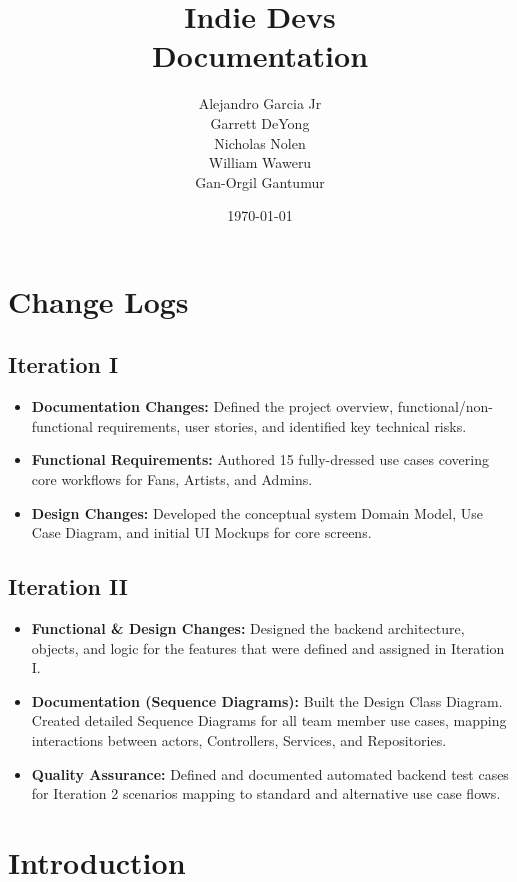 \documentclass[11pt]{report}
\title{\textbf{Indie Devs\\Documentation}}
\author{
{Alejandro Garcia Jr}\\ {Garrett DeYong} \\ {Nicholas Nolen}\\ {William Waweru}\\ {Gan-Orgil Gantumur}}
\date{\today}
\begin{document}
\maketitle

\chapter*{Change Logs}


\section*{Iteration I}
\begin{itemize}
  \item \textbf{Documentation Changes:} Defined the project overview, functional/non-functional requirements, user stories, and identified key technical risks.
  \item \textbf{Functional Requirements:} Authored 15 fully-dressed use cases covering core workflows for Fans, Artists, and Admins.
  \item \textbf{Design Changes:} Developed the conceptual system Domain Model, Use Case Diagram, and initial UI Mockups for core screens.
\end{itemize}

\section*{Iteration II}
\begin{itemize}
  \item \textbf{Functional \& Design Changes:} Designed the backend architecture, objects, and logic for the features that were defined and assigned in Iteration I.
  \item \textbf{Documentation (Sequence Diagrams):} Built the Design Class Diagram. Created detailed Sequence Diagrams for all team member use cases, mapping interactions between actors, Controllers, Services, and Repositories.
  \item \textbf{Quality Assurance:} Defined and documented automated backend test cases for Iteration 2 scenarios mapping to standard and alternative use case flows.
\end{itemize}

\tableofcontents


\chapter{Introduction}
\end{document}
